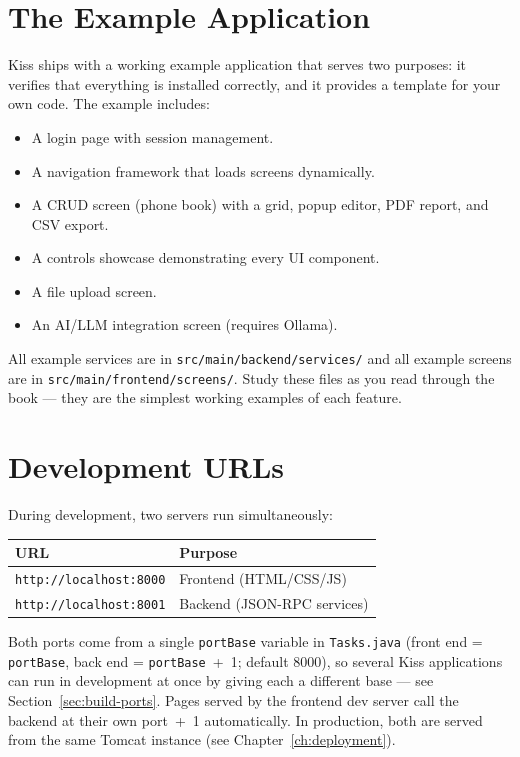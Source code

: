 \section{The Example Application}
\label{sec:setup-example-app}

Kiss ships with a working example application that serves two purposes: it verifies that everything is installed correctly, and it provides a template for your own code.  The example includes:

\begin{itemize}
  \item A login page with session management.
  \item A navigation framework that loads screens dynamically.
  \item A CRUD screen (phone book) with a grid, popup editor, PDF report, and CSV export.
  \item A controls showcase demonstrating every UI component.
  \item A file upload screen.
  \item An AI/LLM integration screen (requires Ollama).
\end{itemize}

\noindent
All example services are in \texttt{src/main/backend/services/} and all example screens are in \texttt{src/main/frontend/screens/}.  Study these files as you read through the book --- they are the simplest working examples of each feature.

\section{Development URLs}
\label{sec:setup-urls}

During development, two servers run simultaneously:

\begin{longtable}{ll}
\toprule
\textbf{URL} & \textbf{Purpose} \\
\midrule
\texttt{http://localhost:8000} & Frontend (HTML/CSS/JS) \\
\texttt{http://localhost:8001} & Backend (JSON-RPC services) \\
\bottomrule
\end{longtable}

\noindent
Both ports come from a single \texttt{portBase} variable in \texttt{Tasks.java} (front end = \texttt{portBase}, back end = \texttt{portBase}~+~1; default 8000), so several Kiss applications can run in development at once by giving each a different base --- see Section~\ref{sec:build-ports}.  Pages served by the frontend dev server call the backend at their own port~+~1 automatically.  In production, both are served from the same Tomcat instance (see Chapter~\ref{ch:deployment}).


